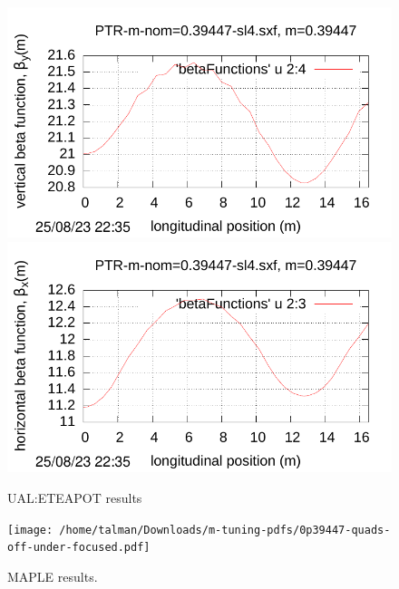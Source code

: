 \documentclass[]{article}
\begin{document}
\begin{figure}[htbp]
\hspace{-0.6cm}
\begin{minipage}[b]{0.49\linewidth}
\centering
\includegraphics[scale=0.5]{pdf/Fig_II-11.pdf}
\includegraphics[scale=0.5]{pdf/Fig_II-9.pdf}
\caption{UAL:ETEAPOT results\hfill}
\label{fig:UAL-PTR-m=0.29447}
\end{minipage}
\begin{minipage}[b]{0.49\linewidth}
\centering
\texttt{[image: /home/talman/Downloads/m-tuning-pdfs/0p39447-quads-off-under-focused.pdf]}
\caption{MAPLE results.\hfill}
\label{fig:MAPLE-PTR-m=0.39447}
\end{minipage}
\end{figure}
%

\clearpage
\end{document}
